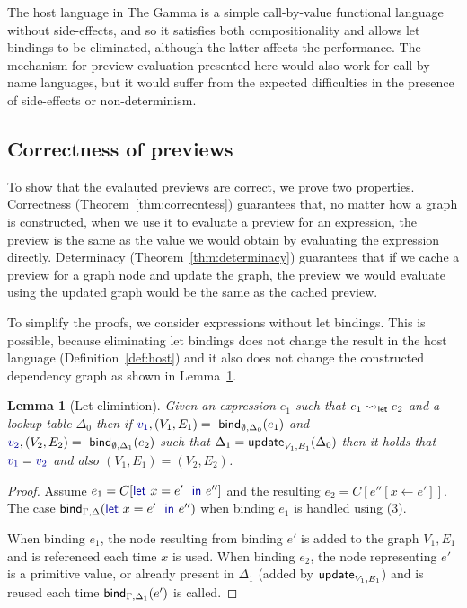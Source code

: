 \documentclass[sigplan,10pt,review,anonymous]{acmart}\settopmatter{printfolios=true,printccs=false,printacmref=false}
\newcounter{thc}
\theoremstyle{plain}
\newtheorem{lem}[thc]{Lemma}
\theoremstyle{definition}
\newcommand{\ident}[1]{\textnormal{\sffamily #1}}
\newcommand{\kvd}[1]{\textnormal{\textcolor{kvdclr}{\sffamily #1}}}
\newcommand{\bndclr}[1]{\textcolor{kvdclr}{#1}}
\begin{document}
\noindent
The host language in The Gamma is a simple call-by-value functional language without side-effects,
and so it satisfies both compositionality and allows let bindings to be eliminated, although the
latter affects the performance. The mechanism for preview evaluation presented here would also 
work for call-by-name languages, but it would suffer from the expected difficulties in the 
presence of side-effects or non-determinism.


\subsection{Correctness of previews}
\label{sec:properties-correct}

To show that the evalauted previews are correct, we prove two properties. Correctness 
(Theorem~\ref{thm:correcntess}) guarantees that, no matter how a graph is constructed, when we use
it to evaluate a preview for an expression, the preview is the same as the value we would obtain
by evaluating the expression directly. Determinacy (Theorem~\ref{thm:determinacy}) guarantees that if
we cache a preview for a graph node and update the graph, the preview we would evaluate using the
updated graph would be the same as the cached preview. 

To simplify the proofs, we consider expressions without let bindings. This is possible, because
eliminating let bindings does not change the result in the host language (Definition~\ref{def:host})
and it also does not change the constructed dependency graph as shown in Lemma~\ref{thm:let-elimination}.

\begin{lem}[Let elimintion]
\label{thm:let-elimination}  
Given an expression $e_1$ such that $e_1 \rightsquigarrow_\ident{let} e_2$ and a lookup table $\Delta_0$
then if $\bndclr{v_1}, (V_1, E_1) = \ident{bind}_{\emptyset, \Delta_0}(e_1)$ and  
$\bndclr{v_2}, (V_2, E_2) = \ident{bind}_{\emptyset, \Delta_1}(e_2)$ such that $\Delta_1 = \ident{update}_{V_1, E_1}(\Delta_0)$
then it holds that $\bndclr{v_1} = \bndclr{v_2}$ and also $(V_1, E_1) = (V_2, E_2)$.
\end{lem}
\begin{proof}
Assume $e_1 = C[\kvd{let}~x=e'~\kvd{in}~e'']$ and the resulting $e_2 = C[e''[x\leftarrow e']]$. The case 
$\ident{bind}_{\Gamma,\Delta}(\kvd{let}~x=e'~\kvd{in}~e'')$ when binding $e_1$ is handled using
(3).

When binding $e_1$, the node resulting from binding $e'$ is added to the graph $V_1, E_1$ and is 
referenced each time $x$ is used. When binding $e_2$, the node representing $e'$ is a primitive value,
or already present in $\Delta_1$ (added by $\ident{update}_{V_1, E_1}$) and is reused each time 
$\ident{bind}_{\Gamma,\Delta_1}(e')$ is called.
\end{proof}
\end{document}
